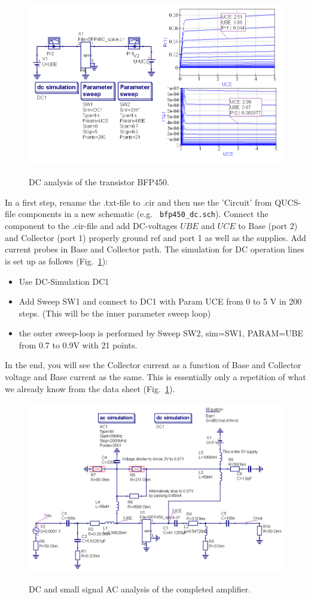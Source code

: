 \begin{figure}
  \centering
  {\includegraphics[width=12cm]{bfp450_dc.png}}
  \caption{DC analysis of the transistor BFP450.}
  \label{fig:bfp450_dc}
\end{figure}

In a first step, rename the .txt-file to .cir and then use the
'Circuit' from QUCS-file components in a new schematic (e.g. {\tt
  bfp450\_dc.sch}). Connect the component to the .cir-file and add 
DC-voltages $UBE$ and $UCE$ to Base (port 2) and Collector (port 1)
properly ground ref and port 1 as well as the supplies. Add current
probes in Base and Collector path. The simulation for DC operation
lines is set up as follows (Fig.~\ref{fig:bfp450_dc}):
\begin{itemize}
\item Use DC-Simulation DC1
\item Add Sweep SW1 and connect to DC1 with Param UCE from 0 to 5 V in
  200 steps. (This will be the inner parameter sweep loop)
\item the outer sweep-loop is performed by Sweep SW2, sim=SW1,
  PARAM=UBE from 0.7 to 0.9V with 21 points.
\end{itemize}
In the end, you will see the Collector current as a function of Base
and Collector voltage and Base current as the same. This is
essentially only a repetition of what we already know from the data
sheet (Fig.~\ref{fig:bfp450_dc}).

\begin{figure}
  \centering
  {\includegraphics[width=12cm]{bfp450_ac_sch.png}}
  \caption{DC and small signal AC analysis of the completed amplifier.}
  \label{fig:bfp450_ac_sch}
\end{figure}

